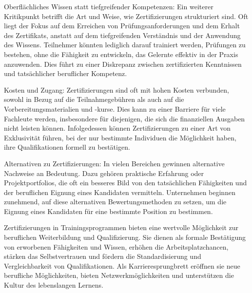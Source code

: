 Oberflächliches Wissen statt tiefgreifender Kompetenzen:
Ein weiterer Kritikpunkt betrifft die Art und Weise, wie Zertifizierungen strukturiert sind. Oft liegt der Fokus auf dem Erreichen von Prüfungsanforderungen und dem Erhalt des Zertifikats, anstatt auf dem tiefgreifenden Verständnis und der Anwendung des Wissens. Teilnehmer könnten lediglich darauf trainiert werden, Prüfungen zu bestehen, ohne die Fähigkeit zu entwickeln, das Gelernte effektiv in der Praxis anzuwenden. Dies führt zu einer Diskrepanz zwischen zertifizierten Kenntnissen und tatsächlicher beruflicher Kompetenz. %

Kosten und Zugang:
Zertifizierungen sind oft mit hohen Kosten verbunden, sowohl in Bezug auf die Teilnahmegebühren als auch auf die Vorbereitungsmaterialien und -kurse. Dies kann zu einer Barriere für viele Fachleute werden, insbesondere für diejenigen, die sich die finanziellen Ausgaben nicht leisten können. Infolgedessen können Zertifizierungen zu einer Art von Exklusivität führen, bei der nur bestimmte Individuen die Möglichkeit haben, ihre Qualifikationen formell zu bestätigen. %

Alternativen zu Zertifizierungen:
In vielen Bereichen gewinnen alternative Nachweise an Bedeutung. Dazu gehören praktische Erfahrung oder Projektportfolios, die oft ein besseres Bild von den tatsächlichen Fähigkeiten und der beruflichen Eignung eines Kandidaten vermitteln. Unternehmen beginnen zunehmend, auf diese alternativen Bewertungsmethoden zu setzen, um die Eignung eines Kandidaten für eine bestimmte Position zu bestimmen.

Zertifizierungen in Trainingsprogrammen bieten eine wertvolle Möglichkeit zur beruflichen Weiterbildung und Qualifizierung. Sie dienen als formale Bestätigung von erworbenen Fähigkeiten und Wissen, erhöhen die Arbeitsplatzchancen, stärken das Selbstvertrauen und fördern die Standardisierung und Vergleichbarkeit von Qualifikationen. Als Karrieresprungbrett eröffnen sie neue berufliche Möglichkeiten, bieten Netzwerkmöglichkeiten und unterstützen die Kultur des lebenslangen Lernens.

